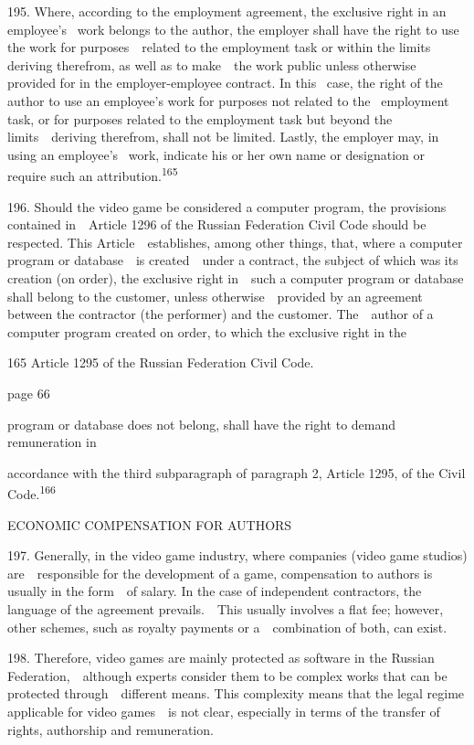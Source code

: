 \documentclass[
]{article}
\begin{document}
{195. }{Where, according to the employment agreement, the exclusive
right in an employee's }{~work belongs to the author, the employer shall
have the right to use the work for purposes~~related to the employment
task or within the limits deriving therefrom, as well as to make~~the
work public unless otherwise provided for in the employer-employee
contract. In this }{~case, the right of the author to use an employee's
work for purposes not related to the }{~employment task, or for purposes
related to the employment task but beyond the limits~~deriving
therefrom, shall not be limited. }{Lastly, the employer may, in using an
employee's }{~work, indicate his or her own name or designation or
require such an attribution.}\textsuperscript{{165}}

{196. }{Should the video game be considered a computer program, the
provisions contained in~~Article 1296 of the Russian Federation }{Civil
Code }{should be respected. This Article~~establishes, among other
things, that, where a computer program or database~~is created~~under a
contract, the subject of which was its creation (on order), the
exclusive right in~~such a computer program or database shall belong to
the customer, unless otherwise~~provided by an agreement between the
contractor (the performer) and the customer. The~~author of a computer
program created on order, to which the exclusive right in the}

{165 }{Article 1295 of the Russian Federation }{Civil Code}{.}

{page 66}

{program or database does not belong, shall have the right to demand
remuneration in}

{accordance with the third subparagraph of paragraph 2, Article 1295, of
the }{Civil Code.}\textsuperscript{{166}}

{ECONOMIC COMPENSATION FOR AUTHORS}

{197. }{Generally, in the video game industry, where companies (video
game studios) are~~responsible for the development of a game,
compensation to authors is usually in the form~~of salary. In the case
of independent contractors, the language of the agreement
prevails.~~This usually involves a flat fee; however, other schemes,
such as royalty payments or a~~combination of both, can exist.}

{198. }{Therefore, video games are mainly protected as software in the
Russian Federation,~~although experts consider them to be complex works
that can be protected through~~different means. This complexity means
that the legal regime applicable for video games~~is not clear,
especially in terms of the transfer of rights, authorship and
remuneration.}
\end{document}
